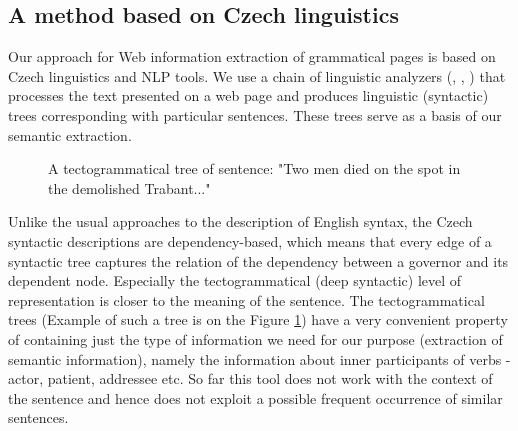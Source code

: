\documentclass{sig-alternate}
\begin{document}

\subsection{A method based on Czech linguistics}
Our approach for Web information extraction of grammatical pages is based on Czech linguistics and NLP tools. We use a chain of linguistic analyzers (\cite{biblio:HajicMorfTag}, \cite{biblio:collinshbrt_1999}, \cite{biblio:KlTransformationBasedTectogrammatical2006}) that processes the text presented on a web page and produces linguistic (syntactic) trees corresponding with particular sentences. These trees serve as a basis of our semantic extraction.


\begin{figure}
\centering
{}
\caption{A tectogrammatical tree of sentence: "Two men died on the spot in the demolished Trabant..."}
\label{img:tectogrammatical}
\end{figure}



Unlike the usual approaches to the description of English syntax, the Czech syntactic descriptions are dependency-based, which means that every edge of a syntactic tree captures the relation of the dependency between a governor and its dependent node. Especially the tectogrammatical (deep syntactic) level of representation \cite{biblio:MiBeAnnotationtectogrammatical2006} is closer to the meaning of the sentence. The tectogrammatical trees (Example of such a tree is on the Figure \ref{img:tectogrammatical}) have a very convenient property of containing just the type of information we need for our purpose (extraction of semantic information), namely the information about inner participants of verbs - actor, patient, addressee etc. So far this tool does not work with the context of the sentence and hence does not exploit a possible frequent occurrence of similar sentences.
\end{document}
